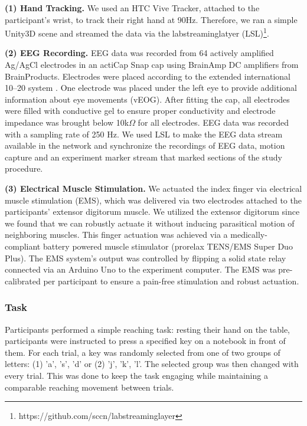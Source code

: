 \indent\textbf{(1) Hand Tracking.} We used an HTC Vive Tracker, attached to the participant's wrist, to track their right hand at 90Hz. Therefore, we ran a simple Unity3D scene and streamed the data via the labstreaminglatyer (LSL)\footnote{https://github.com/sccn/labstreaminglayer}.

\indent\textbf{(2) EEG Recording.} EEG data was recorded from 64 actively amplified Ag/AgCl electrodes in an actiCap Snap cap using BrainAmp DC amplifiers from BrainProducts. Electrodes were placed according to the extended international 10–20 system \cite{Chatrian1985-ys}. One electrode was placed under the left eye to provide additional information about eye movements (vEOG). After fitting the cap, all electrodes were filled with conductive gel to ensure proper conductivity and electrode impedance was brought below 10k$\Omega$ for all electrodes. EEG data was recorded with a sampling rate of 250 Hz. We used LSL to make the EEG data stream available in the network and synchronize the recordings of EEG data, motion capture and an experiment marker stream that marked sections of the study procedure.


\indent\textbf{(3) Electrical Muscle Stimulation.} We actuated the index finger via electrical muscle stimulation (EMS), which was delivered via two electrodes attached to the participants' extensor digitorum muscle. We utilized the extensor digitorum since we found that we can robustly actuate it without inducing parasitical motion of neighboring muscles. This finger actuation was achieved via a medically-compliant battery powered muscle stimulator (prorelax TENS/EMS Super Duo Plus). The EMS system's output was controlled by flipping a solid state relay connected via an Arduino Uno to the experiment computer. The EMS was pre-calibrated per participant to ensure a pain-free stimulation and robust actuation.

\subsubsection{Task}
Participants performed a simple reaching task: resting their hand on the table, participants were instructed to press a specified key on a notebook in front of them. For each trial, a key was randomly selected from one of two groups of letters: (1) 'a', 's', 'd' or (2) 'j', 'k', 'l'. The selected group was then changed with every trial. This was done to keep the task engaging while maintaining a comparable reaching movement between trials.

